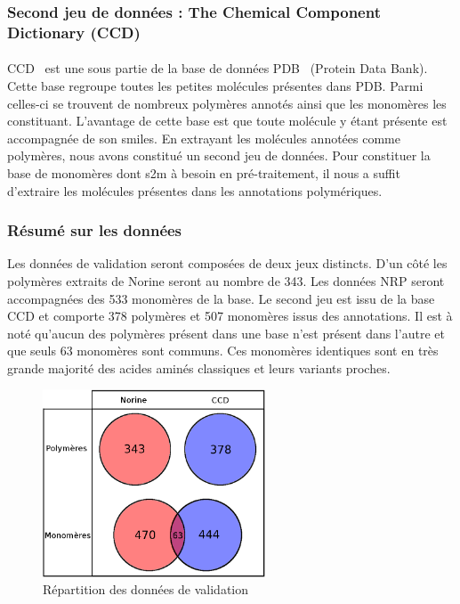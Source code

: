 \documentclass[12pt,french,twoside]{report}
\begin{document}
\subsubsection{Second jeu de données : The Chemical Component Dictionary (CCD)}

\paragraph{}CCD~\cite{westbrook_chemical_2015} est une sous partie de la base de données PDB~\cite{berman_protein_2000} (Protein Data Bank).
Cette base regroupe toutes les petites molécules présentes dans PDB.
Parmi celles-ci se trouvent de nombreux polymères annotés ainsi que les monomères les constituant.
L'avantage de cette base est que toute molécule y étant présente est accompagnée de son smiles.
En extrayant les molécules annotées comme polymères, nous avons constitué un second jeu de données.
Pour constituer la base de monomères dont s2m à besoin en pré-traitement, il nous a suffit d'extraire les molécules présentes dans les annotations polymériques.


\subsubsection{Résumé sur les données}

Les données de validation seront composées de deux jeux distincts.
D'un côté les polymères extraits de Norine seront au nombre de 343.
Les données NRP seront accompagnées des 533 monomères de la base.
Le second jeu est issu de la base CCD et comporte 378 polymères et 507 monomères issus des annotations.
Il est à noté qu'aucun des polymères présent dans une base n'est présent dans l'autre et que seuls 63 monomères sont communs.
Ces monomères identiques sont en très grande majorité des acides aminés classiques et leurs variants proches.

\begin{figure}[!h]
  \begin{center}
    \includegraphics[width=250px]{Figures/s2m/results/data.png}
    \caption{\label{data}Répartition des données de validation}
  \end{center}
\end{figure}
\end{document}
